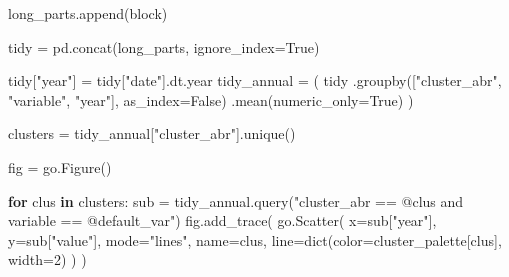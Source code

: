 \documentclass[
  letterpaper,
  DIV=11,
  numbers=noendperiod]{scrreprt}
\newenvironment{Shaded}{\begin{snugshade}}{\end{snugshade}}
\newcommand{\BuiltInTok}[1]{\textcolor[rgb]{0.00,0.23,0.31}{#1}}
\newcommand{\ControlFlowTok}[1]{\textcolor[rgb]{0.00,0.23,0.31}{\textbf{#1}}}
\newcommand{\DecValTok}[1]{\textcolor[rgb]{0.68,0.00,0.00}{#1}}
\newcommand{\KeywordTok}[1]{\textcolor[rgb]{0.00,0.23,0.31}{\textbf{#1}}}
\newcommand{\NormalTok}[1]{\textcolor[rgb]{0.00,0.23,0.31}{#1}}
\newcommand{\OperatorTok}[1]{\textcolor[rgb]{0.37,0.37,0.37}{#1}}
\newcommand{\StringTok}[1]{\textcolor[rgb]{0.13,0.47,0.30}{#1}}
\newcommand{\VariableTok}[1]{\textcolor[rgb]{0.07,0.07,0.07}{#1}}
\begin{document}
\begin{Shaded}
\begin{Highlighting}[]
\NormalTok{    long\_parts.append(block)}

\NormalTok{tidy }\OperatorTok{=}\NormalTok{ pd.concat(long\_parts, ignore\_index}\OperatorTok{=}\VariableTok{True}\NormalTok{)}

\NormalTok{tidy[}\StringTok{"year"}\NormalTok{] }\OperatorTok{=}\NormalTok{ tidy[}\StringTok{"date"}\NormalTok{].dt.year}
\NormalTok{tidy\_annual }\OperatorTok{=}\NormalTok{ (}
\NormalTok{    tidy}
\NormalTok{      .groupby([}\StringTok{"cluster\_abr"}\NormalTok{, }\StringTok{"variable"}\NormalTok{, }\StringTok{"year"}\NormalTok{], as\_index}\OperatorTok{=}\VariableTok{False}\NormalTok{)}
\NormalTok{      .mean(numeric\_only}\OperatorTok{=}\VariableTok{True}\NormalTok{)}
\NormalTok{)}

\NormalTok{clusters }\OperatorTok{=}\NormalTok{ tidy\_annual[}\StringTok{"cluster\_abr"}\NormalTok{].unique()}

\NormalTok{fig }\OperatorTok{=}\NormalTok{ go.Figure()}

\ControlFlowTok{for}\NormalTok{ clus }\KeywordTok{in}\NormalTok{ clusters:}
\NormalTok{    sub }\OperatorTok{=}\NormalTok{ tidy\_annual.query(}\StringTok{"cluster\_abr == @clus and variable == @default\_var"}\NormalTok{)}
\NormalTok{    fig.add\_trace(}
\NormalTok{        go.Scatter(}
\NormalTok{            x}\OperatorTok{=}\NormalTok{sub[}\StringTok{"year"}\NormalTok{],}
\NormalTok{            y}\OperatorTok{=}\NormalTok{sub[}\StringTok{"value"}\NormalTok{],}
\NormalTok{            mode}\OperatorTok{=}\StringTok{"lines"}\NormalTok{,}
\NormalTok{            name}\OperatorTok{=}\NormalTok{clus,}
\NormalTok{            line}\OperatorTok{=}\BuiltInTok{dict}\NormalTok{(color}\OperatorTok{=}\NormalTok{cluster\_palette[clus], width}\OperatorTok{=}\DecValTok{2}\NormalTok{)}
\NormalTok{        )}
\NormalTok{    )}


\end{Highlighting}
\end{Shaded}
\end{document}
